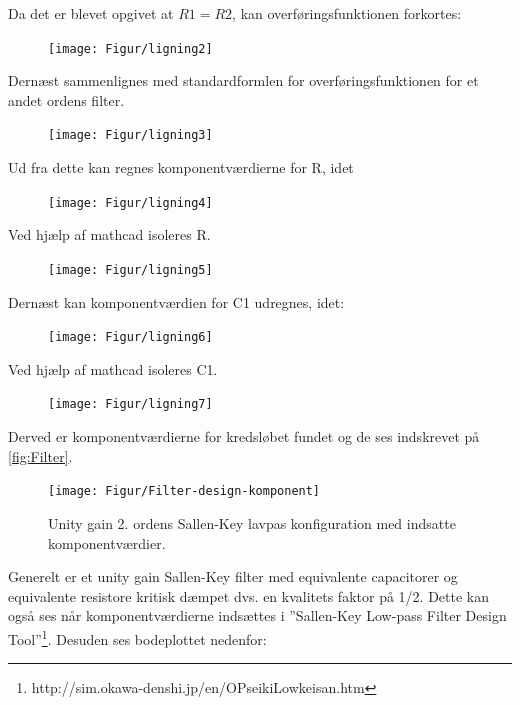 Da det er blevet opgivet at $R1=R2$, kan overføringsfunktionen forkortes: 

\begin{figure}[h]
	\centering
	\texttt{[image: Figur/ligning2]}
	\label{fig:lign2}
\end{figure}

Dernæst sammenlignes med standardformlen for overføringsfunktionen for et andet ordens filter.

\begin{figure}[h]
	\centering
	\texttt{[image: Figur/ligning3]}
	\label{fig:lign3}
\end{figure}

Ud fra dette kan regnes komponentværdierne for R, idet

\begin{figure}[h]
	\centering
	\texttt{[image: Figur/ligning4]}
	\label{fig:lign4}
\end{figure}

Ved hjælp af mathcad isoleres R.

\begin{figure}[h]
	\centering
	\texttt{[image: Figur/ligning5]}
	\label{fig:lign5}
\end{figure}

Dernæst kan komponentværdien for C1 udregnes, idet:

\begin{figure}[h]
	\centering
	\texttt{[image: Figur/ligning6]}
	\label{fig:lign6}
\end{figure}

Ved hjælp af mathcad isoleres C1. 

\begin{figure}[h]
	\centering
	\texttt{[image: Figur/ligning7]}
	\label{fig:lign7}
\end{figure}

Derved er komponentværdierne for kredsløbet fundet og de ses indskrevet på \ref{fig:Filter}. 

\begin{figure}[h]
	\centering
	\texttt{[image: Figur/Filter-design-komponent]}
	\caption{Unity gain 2. ordens Sallen-Key lavpas konfiguration med indsatte komponentværdier.}
	\label{fig:Filter_K}
\end{figure}

Generelt er et unity gain Sallen-Key filter med equivalente capacitorer og equivalente resistore kritisk dæmpet dvs. en kvalitets faktor på 1/2. Dette kan også ses når komponentværdierne indsættes i ”Sallen-Key Low-pass Filter Design Tool”\footnote{http://sim.okawa-denshi.jp/en/OPseikiLowkeisan.htm}. Desuden ses bodeplottet nedenfor:

